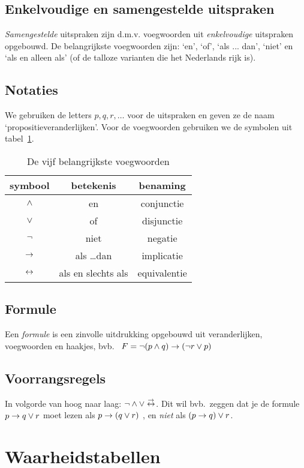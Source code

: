 \subsection{Enkelvoudige en samengestelde uitspraken}
\emph{Samengestelde} uitspraken zijn d.m.v. voegwoorden uit \emph{enkelvoudige} uitspraken opgebouwd. De belangrijkste voegwoorden zijn: `en', `of', `als ... dan', `niet' en `als en alleen als' (of de talloze varianten die het Nederlands rijk is).
\subsection{Notaties}
We gebruiken de letters $p, q, r, \ldots$ voor de uitspraken en geven ze de naam `propositieveranderlijken'. Voor de voegwoorden gebruiken we de symbolen uit tabel~\ref{tbl:voegwoorden}.


\begin{table}[htb]
  \centering
  \caption{De vijf belangrijkste voegwoorden}\label{tbl:voegwoorden}
\begin{tabular}{ccc}
\toprule
 symbool  & betekenis & benaming \\ \midrule
  $\wedge$ & en & conjunctie \\
   $\vee$ & of & disjunctie \\
   $\neg$ & niet & negatie \\
   $\rightarrow$ & als \ldots dan & implicatie \\
   $\leftrightarrow$ & als en slechts als & equivalentie \\
\bottomrule
\end{tabular}
\end{table}

\subsection{Formule}
Een \emph{formule} is een zinvolle uitdrukking opgebouwd uit veranderlijken, voegwoorden en haakjes,
bvb. \ $F = \neg (p \wedge q) \rightarrow (\neg r \vee p)$

\subsection{Voorrangsregels}
In volgorde van hoog naar laag: $\neg \wedge \vee \stackrel{\rightarrow}{\leftrightarrow}$. Dit wil bvb.\ zeggen dat je de formule  $p \rightarrow q \vee r$ moet lezen als $p \rightarrow (q \vee r)$ , en \emph{niet} als $(p \rightarrow q) \vee r$.

\section{Waarheidstabellen}
